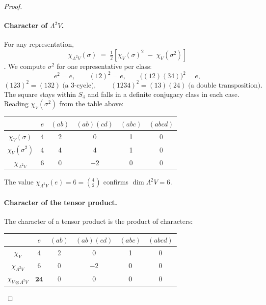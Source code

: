 \documentclass[11pt]{article}
\theoremstyle{plain}
\theoremstyle{remark}
\begin{document}
\begin{proof}
\paragraph{Character of $\Lambda^2 V$.}
For any representation,
\begin{equation}
\chi_{\Lambda^2 V}(\sigma) \;=\; \tfrac{1}{2}\!\left[\chi_V(\sigma)^2 \;-\; \chi_V(\sigma^2)\right]
\label{eq:lambda2-character}
\end{equation}
\cite[\S 2.1, Prop.~2.1]{Serre1977}. We compute $\sigma^2$ for one representative per class:
\[
e^2 = e, \qquad (12)^2 = e, \qquad \big((12)(34)\big)^{\!2} = e,
\]
\[
(123)^2 = (132) \;\text{(a $3$-cycle)}, \qquad (1234)^2 = (13)(24) \;\text{(a double transposition)}.
\]
The square stays within $S_4$ and falls in a definite conjugacy class in each case. Reading $\chi_V(\sigma^2)$ from the table above:
\begin{center}
\begin{tabular}{c|ccccc}
                       & $e$ & $(ab)$ & $(ab)(cd)$ & $(abc)$ & $(abcd)$ \\ \hline
$\chi_V(\sigma)$       & 4   & 2      & 0          & 1       & 0        \\
$\chi_V(\sigma^2)$     & 4   & 4      & 4          & 1       & 0        \\
$\chi_{\Lambda^2 V}$   & 6   & 0      & $-2$       & 0       & 0
\end{tabular}
\end{center}
The value $\chi_{\Lambda^2 V}(e) = 6 = \binom{4}{2}$ confirms $\dim \Lambda^2 V = 6$.

\paragraph{Character of the tensor product.}
The character of a tensor product is the product of characters:
\begin{center}
\begin{tabular}{c|ccccc}
                                & $e$        & $(ab)$ & $(ab)(cd)$ & $(abc)$ & $(abcd)$ \\ \hline
$\chi_V$                        & 4          & 2      & 0          & 1       & 0        \\
$\chi_{\Lambda^2 V}$            & 6          & 0      & $-2$       & 0       & 0        \\ \hline
$\chi_{V \otimes \Lambda^2 V}$  & $\bm{24}$  & 0      & 0          & 0       & 0
\end{tabular}
\end{center}


\end{proof}
\end{document}
